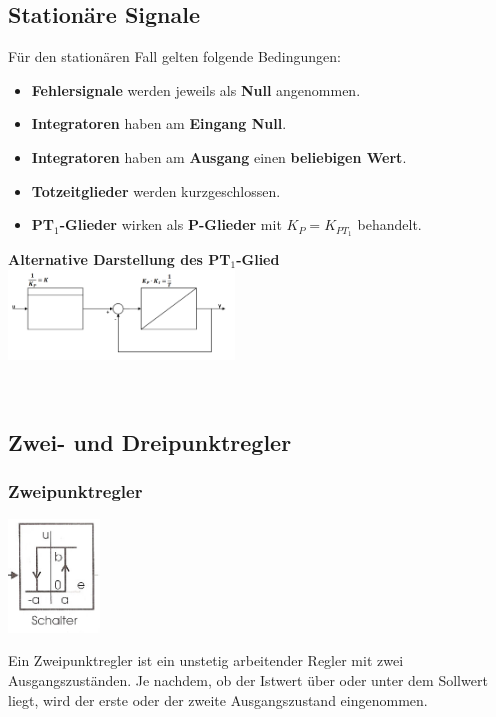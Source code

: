     
    \begin{minipage}{11cm}
    \subsection{Stationäre Signale}
	Für den stationären Fall gelten folgende Bedingungen:
	\begin{itemize}
    	\item \textbf{Fehlersignale} werden jeweils als \textbf{Null} angenommen.
    	\item \textbf{Integratoren} haben am \textbf{Eingang Null}.
    	\item \textbf{Integratoren} haben am \textbf{Ausgang} einen \textbf{beliebigen Wert}.
    	\item \textbf{Totzeitglieder} werden kurzgeschlossen.
    	\item \textbf{PT$_1$-Glieder} wirken als \textbf{P-Glieder} mit $K_P = K_{PT_1}$ behandelt.
  	\end{itemize}
  	\end{minipage}
  	\begin{minipage}{7cm}
  		\textbf{Alternative Darstellung des PT$_1$-Glied}\\
  		\includegraphics[width=6cm]{./bilder/PT1_2.png}
  	\end{minipage} \\


	\subsection{Zwei- und Dreipunktregler}
	\subsubsection{Zweipunktregler }
		\begin{minipage}{3cm}
 		\includegraphics[height=3cm]{./bilder/Zweipunktregler.jpg}
        \end{minipage}
		\begin{minipage}{15cm}
        Ein Zweipunktregler ist ein unstetig arbeitender Regler mit zwei
        Ausgangszuständen. Je nachdem, ob der Istwert über oder unter dem
        Sollwert liegt, wird der erste oder der zweite Ausgangszustand
        eingenommen. 
        \end{minipage}
        
